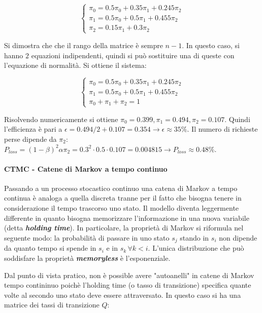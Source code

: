 \documentclass{article}
\begin{document}
\begin{equation}
  \begin{cases}
    \pi_0 = 0.5\pi_0 + 0.35\pi_1 + 0.245\pi_2\\
    \pi_1= 0.5\pi_0 + 0.5\pi_1 + 0.455\pi_2\\
    \pi_2 = 0.15\pi_1 + 0.3\pi_2
  \end{cases} 
\end{equation}

Si dimostra che che il rango della matrice è sempre $n-1$. In questo caso, si hanno $2$ 
equazioni indipendenti, quindi si può sostituire una di queste con l'equazione di normalità. 
Si ottiene il sistema:

\begin{equation}
  \begin{cases}
    \pi_0 = 0.5\pi_0 + 0.35\pi_1 + 0.245\pi_2\\
    \pi_1= 0.5\pi_0 + 0.5\pi_1 + 0.455\pi_2\\
    \pi_0 + \pi_1 + \pi_2 = 1
  \end{cases} 
\end{equation}

Risolvendo numericamente si ottiene $\pi_0 = 0.399, \pi_1 = 0.494, \pi_2=0.107$.
Quindi l'efficienza è pari a $\epsilon = 0.494/2 + 0.107 = 0.354 \to \epsilon \approx 35\%$. 
Il numero di richieste perse dipende da $\pi_2$: $P_{loss} = (1-\beta)^2\alpha\pi_2 = 0.3^2 
\cdot0.5\cdot0.107 = 0.004815 \to P_{loss}\approx0.48\%$.


\paragraph{CTMC - Catene di Markov a tempo continuo}
Passando a un processo stocastico continuo una catena di Markov a tempo continua è analoga
a quella discreta tranne per il fatto che bisogna tenere in considerazione il tempo trascorso
uno stato. Il modello diventa leggermente differente in quanto  bisogna memorizzare
l'informazione in una nuova variabile (detta \textbf{\textit{holding time}}). In particolare,
la proprietà di Markov si riformula nel seguente modo: la probabilità di passare in uno stato
$s_j$ stando in $s_i$ non dipende da quanto tempo si spende in $s_i$ e in $s_k\, \forall k <
i$. L'unica distribuzione che può soddisfare la proprietà \textbf{\textit{memoryless}} è
l'esponenziale.

Dal punto di vista pratico, non è possible avere "autoanelli" in catene di Markov tempo 
contininuo poichè l'holding time (o tasso di transizione) specifica quante volte al secondo
uno stato deve essere attraversato. In questo caso si ha una matrice dei tassi di transizione 
$Q$:
\end{document}

